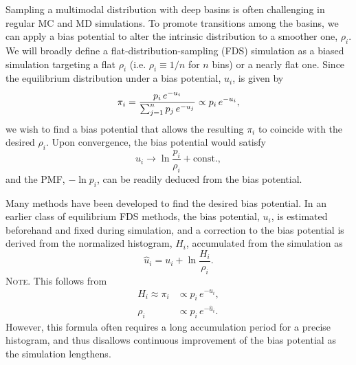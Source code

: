 \documentclass[reprint, superscriptaddress, floatfix]{revtex4-1}
\newcommand{\note}[1]{{\color{DarkGreen}\footnotesize \textsc{Note.} #1}}
\begin{document}
Sampling a multimodal distribution with deep basins
is often challenging in regular MC and MD simulations.
%
To promote transitions among the basins,
we can apply a bias potential to alter
the intrinsic distribution to a smoother one, $\rho_i$.
%
We will broadly define
a flat-distribution-sampling (FDS) simulation
as a biased simulation
targeting a flat $\rho_i$ (i.e. $\rho_i \equiv 1/n$ for $n$ bins)
or a nearly flat one\cite{
dayal2004, *trebst2004, barducci2008, singh2011}.
%
Since the equilibrium distribution
under a bias potential, $u_i$, is given by
%
\begin{equation}
  \pi_i
  =
  \frac{                p_i \, e^{-u_i} }
       { \sum_{j = 1}^n p_j \, e^{-u_j} }
  \propto
  p_i \, e^{-u_i}
  ,
  \notag
\end{equation}
%
we wish to find a bias potential that allows
the resulting $\pi_i$ to coincide
with the desired $\rho_i$.
%
Upon convergence, the bias potential would satisfy
%
\begin{equation}
  u_i \to \ln \frac{p_i}{\rho_i} + \mathrm{const.}
  ,
  \label{eq:Vi_target}
\end{equation}
%
and the PMF, $-\ln p_i$, can be readily
deduced from the bias potential. %



Many methods\cite{mezei1987, berg1992, *lee1993,
wang2001, wang2001pre, huber1994,
*laio2002, *laio2008, *barducci2011, *sutto2012}
have been developed to find the desired bias potential.
%
In an earlier class of equilibrium FDS methods\cite{
  mezei1987, berg1992, *lee1993, marinari1992, *lyubartsev1992},
the bias potential, $u_i$, is
estimated beforehand and fixed
during simulation,
%
and a correction to the bias potential
is derived from the normalized histogram, $H_i$,
accumulated from the simulation as
%
\begin{equation}
  \hat u_i
  =
  u_i
  +
  \ln \frac{ H_i }
           { \rho_i }.
  \label{eq:vcorr_equil}
\end{equation}
%
\note{This follows from
  \begin{align*}
    H_i \approx \pi_i
    &\propto p_i \, e^{-u_i},
    \\
    \rho_i
    &\propto p_i \, e^{-\hat u_i}.
  \end{align*}
}
However, this formula often requires a long
accumulation period for a precise histogram,
and thus disallows
continuous improvement of the bias potential
as the simulation lengthens.
\end{document}
